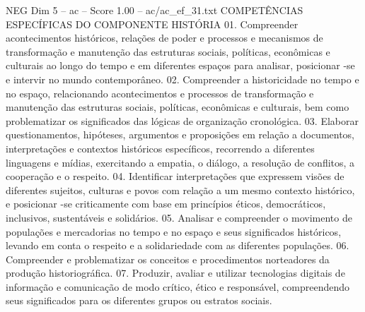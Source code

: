 \begin{textsample}{NEG Dim 5 – ac – Score 1.00 – ac/ac\_ef\_31.txt}
COMPETÊNCIAS ESPECÍFICAS DO COMPONENTE HISTÓRIA 01.
Compreender acontecimentos históricos, relações de poder e processos e mecanismos de transformação e manutenção das estruturas sociais, políticas, econômicas e culturais ao longo do tempo e em diferentes espaços para analisar, posicionar -se e intervir no mundo contemporâneo. 02.
Compreender a historicidade no tempo e no espaço, relacionando acontecimentos e processos de transformação e manutenção das estruturas sociais, políticas, econômicas e culturais, bem como problematizar os significados das lógicas de organização cronológica. 03.
Elaborar questionamentos, hipóteses, argumentos e proposições em relação a documentos, interpretações e contextos históricos específicos, recorrendo a diferentes linguagens e mídias, exercitando a empatia, o diálogo, a resolução de conflitos, a cooperação e o respeito. 04.
Identificar interpretações que expressem visões de diferentes sujeitos, culturas e povos com relação a um mesmo contexto histórico, e posicionar -se criticamente com base em princípios éticos, democráticos, inclusivos, sustentáveis e solidários. 05.
Analisar e compreender o movimento de populações e mercadorias no tempo e no espaço e seus significados históricos, levando em conta o respeito e a solidariedade com as diferentes populações. 06.
Compreender e problematizar os conceitos e procedimentos norteadores da produção historiográfica. 07.
Produzir, avaliar e utilizar tecnologias digitais de informação e comunicação de modo crítico, ético e responsável, compreendendo seus significados para os diferentes grupos ou estratos sociais.

\end{textsample}
